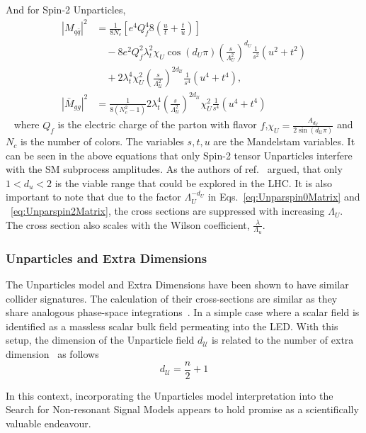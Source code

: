 And for Spin-2 Unparticles, 
\begin{align*}
|M_{q\bar{q}}|^2 &= \frac{1}{8N_c} \left[ e^4Q_f^4 8 \left( \frac{u}{t} + \frac{t}{u}\right) \right] \\
&\quad - 8e^2Q_f^2\lambda^2_t\chi_{U} \cos(d_{U}\pi) \left(\frac{s}{\Lambda^2_{U}}\right)^{d_U} \frac{1}{s^2} \left(u^2 + t^2\right) \\
&\quad + 2 \lambda^4_t \chi^2_{U} \left(\frac{s}{\Lambda^2_{\mathcal{U}}}\right)^{2d_{\mathcal{U}}} \frac{1}{s^4} \left(u^4+t^4\right), \\
|\bar{M}_{gg}|^2 &= \frac{1}{8(N^2_c-1)}2 \lambda^4_t \left(\frac{s}{\Lambda^2_{\mathcal{U}}}\right)^{2d_{\mathcal{U}}}\chi^2_{U} \frac{1}{s^4} \left(u^4+t^4\right)
\end{align*}
~\label{eq:Unparspin2Matrix}
where $Q_f$ is the electric charge of the parton with flavor $f$,$\chi_{U} = \frac{A_{d_{\mathcal{U}}}}{2\sin(d_{\mathcal{U}} \pi)}$ and $N_c$ is the number of colors. The variables $s, t, u$ are the Mandelstam variables. It can be seen in the above equations that only Spin-2 tensor Unparticles interfere with the SM subprocess amplitudes. As the authors of ref.~\cite{Kumar:2007af} argued, that only $1< d_{u} <2$ is the viable range that could be explored in the LHC. It is also important to note that due to the factor $\Lambda^{-d_{U}}_U$ in Eqs.~\ref{eq:Unparspin0Matrix} and ~\ref{eq:Unparspin2Matrix}, the cross sections are suppressed with increasing $\Lambda_{U}$. The cross section also scales with the Wilson coefficient, $\frac{\lambda}{\Lambda_{u}}$.
 
\subsubsection{Unparticles and Extra Dimensions}

The Unparticles model and Extra Dimensions have been shown to have similar collider signatures. The calculation of their cross-sections are similar as they share analogous phase-space integrations~\cite{Ask:2009pv, Cheung:2007ap}. In a simple case where a scalar field is identified as a massless scalar bulk field permeating into the LED. With this setup, the dimension of the Unparticle field $d_{\mathcal{U}}$ is related to the number of extra dimension~\cite{Cheung:2007ap} as follows
\begin{equation}
    d_{\mathcal{U}} = \frac{n}{2} +1
\end{equation}

In this context, incorporating the Unparticles model interpretation into the Search for Non-resonant Signal Models appears to hold promise as a scientifically valuable endeavour.

